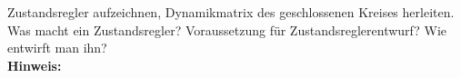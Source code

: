 \begin{question}[section=8,name={Zustandsregler},difficulty=,type=mdl,tags={}]
	Zustandsregler aufzeichnen, Dynamikmatrix des geschlossenen Kreises herleiten. Was macht ein Zustandsregler? Voraussetzung für Zustandsreglerentwurf? Wie entwirft man ihn?
	\\ \textbf{Hinweis:}\\
	
\end{question}
\begin{solution}
	
\end{solution}